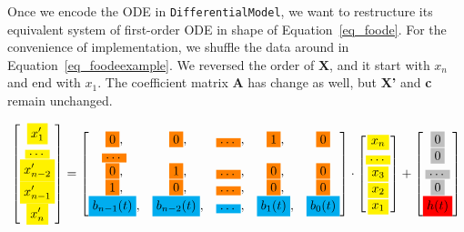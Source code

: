 Once we encode the ODE in \verb|DifferentialModel|, we want to restructure its equivalent system of first-order ODE in shape of Equation~\ref{eq_foode}. For the convenience of implementation, we shuffle the data around in Equation~\ref{eq_foodeexample}. We reversed the order of \textbf{X}, and it start with $x_{n}$ and end with $x_{1}$. The coefficient matrix \textbf{A} has change as well, but \textbf{X'} and \textbf{c} remain unchanged.



\begin{equation} \label{eq_foodeexamplecolor}
	\begin{bmatrix}
		\highlight{yellow}{x_{1}'} \\
    \highlight{yellow}{\dots} \\
    \highlight{yellow}{x_{n-2}'} \\
    \highlight{yellow}{x_{n-1}'} \\
    \highlight{yellow}{x_{n}'}
	\end{bmatrix}
    = 
  \begin{bmatrix}
		\highlight{orange}{0}, & \highlight{orange}{0}, & \highlight{orange}{\dots}, & \highlight{orange}{1}, & \highlight{orange}{0} \\
    \highlight{orange}{\dots} \\
    \highlight{orange}{0}, & \highlight{orange}{1}, & \highlight{orange}{\dots}, & \highlight{orange}{0}, & \highlight{orange}{0} \\
    \highlight{orange}{1}, & \highlight{orange}{0}, & \highlight{orange}{\dots}, & \highlight{orange}{0}, & \highlight{orange}{0} \\
    \highlight{cyan}{b_{n-1}(t)}, & \highlight{cyan}{b_{n-2}(t)}, & \highlight{cyan}{\dots}, & \highlight{cyan}{b_{1}(t)}, & \highlight{cyan}{b_{0}(t)}
	\end{bmatrix}
    \cdot
  \begin{bmatrix}
    \highlight{yellow}{x_{n}} \\
    \highlight{yellow}{\dots} \\
    \highlight{yellow}{x_{3}} \\
		\highlight{yellow}{x_{2}} \\
    \highlight{yellow}{x_{1}}
	\end{bmatrix}
    + 
  \begin{bmatrix}
    \highlight{lightgray}{0} \\
    \highlight{lightgray}{0} \\
    \highlight{lightgray}{\dots} \\
    \highlight{lightgray}{0} \\
    \highlight{red}{h(t)}
	\end{bmatrix}
\end{equation}

